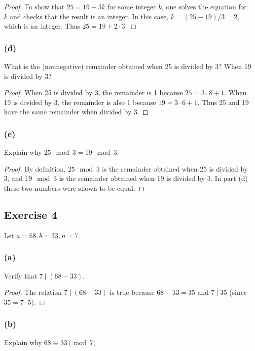 \documentclass[14pt]{extarticle}
\begin{document}
\begin{proof}
To show that \(25 = 19 + 3k\) for some integer \(k\), one solves the equation for \(k\) and checks that the result is 
an integer. In this case, \(k = (25 - 19)/3 = 2\), which is an integer. Thus \(25 = 19 + 2 \cdot 3\).
\end{proof}

\subsubsection{(d)}
What is the (nonnegative) remainder obtained when 25 is divided by 3? When 19 is divided by 3?

\begin{proof}
When 25 is divided by 3, the remainder is 1 because \(25 = 3 \cdot 8 + 1\). When 19 is divided by 3, the remainder is 
also 1 because \(19 = 3 \cdot 6 + 1\). Thus 25 and 19 have the same remainder when divided by 3.
\end{proof}

\subsubsection{(e)}
Explain why \(25 \mod 3 = 19 \mod 3\).

\begin{proof}
By definition, \(25 \mod 3\) is the remainder obtained when 25 is divided by 3, and \(19 \mod 3\) is the remainder 
obtained when 19 is divided by 3. In part (d) these two numbers were shown to be equal.
\end{proof}

\subsection{Exercise 4}
Let \(a = 68, b = 33, n = 7\).

\subsubsection{(a)}
Verify that \(7 \mid (68 - 33)\).

\begin{proof}
The relation \(7 \mid (68 - 33)\) is true because \(68 - 33 = 35\) and \(7 \mid 35\) (since \(35 = 7 \cdot 5\)).
\end{proof}

\subsubsection{(b)}
Explain why \(68 \equiv 33 \pmod 7\).
\end{document}
